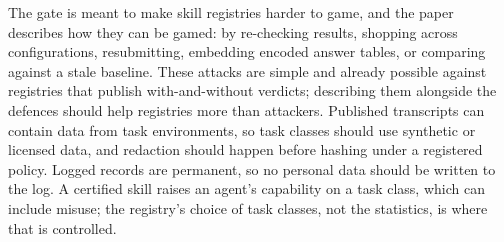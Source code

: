 The gate is meant to make skill registries harder to game, and the paper describes how they can be gamed: by re-checking results, shopping across configurations, resubmitting, embedding encoded answer tables, or comparing against a stale baseline. These attacks are simple and already possible against registries that publish with-and-without verdicts; describing them alongside the defences should help registries more than attackers. Published transcripts can contain data from task environments, so task classes should use synthetic or licensed data, and redaction should happen before hashing under a registered policy. Logged records are permanent, so no personal data should be written to the log. A certified skill raises an agent's capability on a task class, which can include misuse; the registry's choice of task classes, not the statistics, is where that is controlled.
